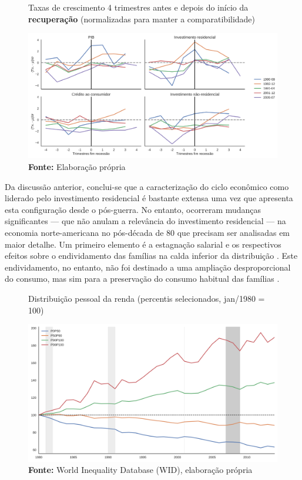 \begin{figure}[H]
	\centering
	\caption{Taxas de crescimento 4 trimestres antes e depois do início da  \textbf{recuperação} (normalizadas para manter a comparatibilidade)}
	\label{FigRecuperacaoNorm}
	\includegraphics[width=\textwidth]{../../Dados/Fatos_Estilizados/figs/Centrado_Fim_Norm.png}
	\caption*{\textbf{Fonte:} Elaboração própria}
\end{figure}



Da discussão anterior, conclui-se que a caracterização do ciclo econômico como liderado pelo investimento residencial é bastante extensa uma vez que apresenta esta configuração desde o pós-guerra.
No entanto, ocorreram mudanças significantes --- que não anulam a relevância do investimento residencial --- na economia norte-americana no pós-década de 80 que precisam ser analisadas em maior detalhe.
Um primeiro elemento é a estagnação salarial e os respectivos efeitos sobre o endividamento das famílias na calda inferior da distribuição \cites{barba_rising_2009}{teixeira_uma_2011}. 
Este endividamento, no entanto, não foi destinado a uma ampliação desproporcional do consumo, mas sim para a preservação do consumo habitual das famílias
\cites{wolf_rising_2010}{cynamon_inequality_2013}.


\begin{figure}[H]
	\centering
	\caption{Distribuição pessoal da renda (percentis selecionados, jan/1980 = 100)}
	\label{FigDistPessoal}
	\includegraphics[width=\textwidth]{../../Dados/Fatos_Estilizados/figs/Dist_Pessoal.png}
	\caption*{\textbf{Fonte:} World Inequality Database (WID), elaboração própria}
\end{figure}


